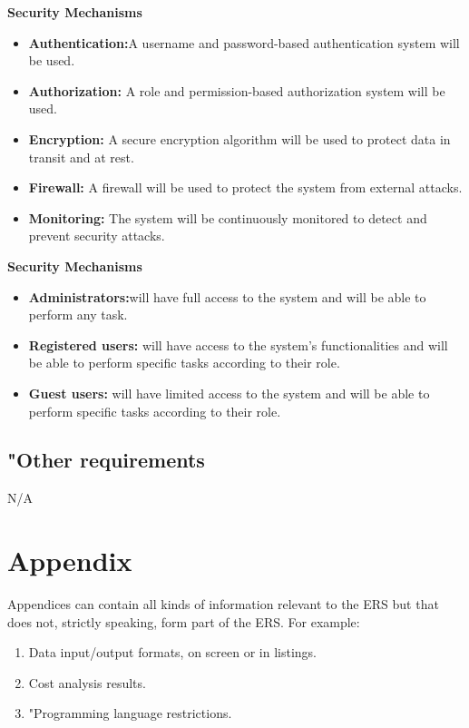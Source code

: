 \documentclass[12pt,a4paper, twosite]{article}
\begin{document}
\textbf{Security Mechanisms}    
\begin{itemize}
    \item \textbf{Authentication:}A username and password-based authentication system will be used.
    \item \textbf{Authorization:} A role and permission-based authorization system will be used.
    \item \textbf{Encryption:} A secure encryption algorithm will be used to protect data in transit and at rest.
    \item \textbf{Firewall:} A firewall will be used to protect the system from external attacks.
    \item \textbf{Monitoring:} The system will be continuously monitored to detect and prevent security attacks.
\end{itemize}

\textbf{Security Mechanisms}    
\begin{itemize}
    \item \textbf{Administrators:}will have full access to the system and will be able to perform any task.
    \item \textbf{Registered users: } will have access to the system's functionalities and will be able to perform specific tasks according to their role.
    \item \textbf{Guest users:} will have limited access to the system and will be able to perform specific tasks according to their role.
\end{itemize}

\subsection{"Other requirements}
\label{sec:org31d2978}

N/A

\newpage


\section{Appendix}
\label{sec:org75cea03}

Appendices can contain all kinds of information relevant to the ERS but that does not, strictly speaking, form part of the ERS. For example:

\begin{enumerate}
\item Data input/output formats, on screen or in listings.
\item Cost analysis results.
\item "Programming language restrictions.
\end{enumerate}
\end{document}

